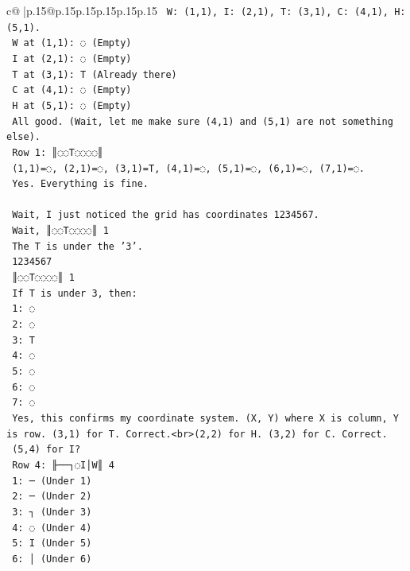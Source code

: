 \documentclass{article}
\begin{document}
{\begin{supertabular}{c@{$\;$}|p{.15\linewidth}@{}p{.15\linewidth}p{.15\linewidth}p{.15\linewidth}p{.15\linewidth}p{.15\linewidth}}
{{{\texttt{    W: (1,1), I: (2,1), T: (3,1), C: (4,1), H: (5,1).} \\
\texttt{    W at (1,1): ◌ (Empty)} \\
\texttt{    I at (2,1): ◌ (Empty)} \\
\texttt{    T at (3,1): T (Already there)} \\
\texttt{    C at (4,1): ◌ (Empty)} \\
\texttt{    H at (5,1): ◌ (Empty)} \\
\texttt{    All good. (Wait, let me make sure (4,1) and (5,1) are not something else).} \\
\texttt{    Row 1: ║◌◌T◌◌◌◌║} \\
\texttt{    (1,1)=◌, (2,1)=◌, (3,1)=T, (4,1)=◌, (5,1)=◌, (6,1)=◌, (7,1)=◌.} \\
\texttt{    Yes. Everything is fine.} \\
\\ 
\texttt{    Wait, I just noticed the grid has coordinates 1234567.} \\
\texttt{    Wait, ║◌◌T◌◌◌◌║ 1} \\
\texttt{    The T is under the '3'.} \\
\texttt{     1234567} \\
\texttt{    ║◌◌T◌◌◌◌║ 1} \\
\texttt{    If T is under 3, then:} \\
\texttt{    1: ◌} \\
\texttt{    2: ◌} \\
\texttt{    3: T} \\
\texttt{    4: ◌} \\
\texttt{    5: ◌} \\
\texttt{    6: ◌} \\
\texttt{    7: ◌} \\
\texttt{    Yes, this confirms my coordinate system. (X, Y) where X is column, Y is row. (3,1) for T. Correct.<br>(2,2) for H. (3,2) for C. Correct.} \\
\texttt{    (5,4) for I?} \\
\texttt{    Row 4: ╟──┐◌I│W║ 4} \\
\texttt{    1: ─ (Under 1)} \\
\texttt{    2: ─ (Under 2)} \\
\texttt{    3: ┐ (Under 3)} \\
\texttt{    4: ◌ (Under 4)} \\
\texttt{    5: I (Under 5)} \\
\texttt{    6: │ (Under 6)} \\
}}}
\end{supertabular}}
\end{document}
